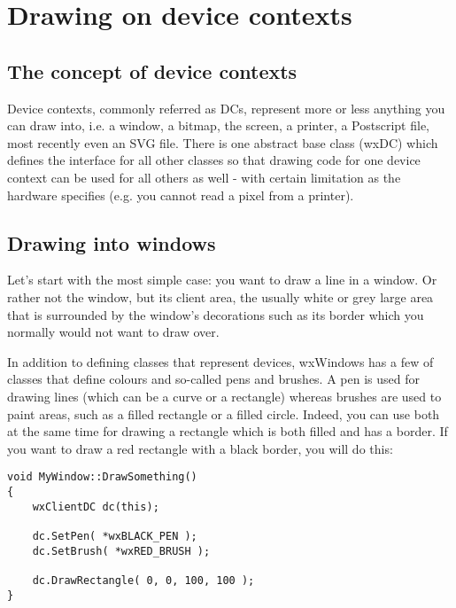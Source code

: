 \chapter{Drawing on device contexts}\label{chapdrawing}
%
%
\setfooter{\thepage}{}{}{}{}{\thepage}%

\section{The concept of device contexts}

Device contexts, commonly referred as DCs, represent more or less anything
you can draw into, i.e. a window, a bitmap, the screen, a printer, a Postscript
file, most recently even an SVG file. There is one abstract base class (wxDC)
which defines the interface for all other classes so that drawing code for
one device context can be used for all others as well - with certain limitation
as the hardware specifies (e.g. you cannot read a pixel from a printer).

\section{Drawing into windows}

Let's start with the most simple case: you want to draw a line in a window.
Or rather not the window, but its client area, the usually white or grey
large area that is surrounded by the window's decorations such as its border
which you normally would not want to draw over.

In addition to defining classes that represent devices, wxWindows has a few
of classes that define colours and so-called pens and brushes. A pen is used
for drawing lines (which can be a curve or a rectangle) whereas brushes are
used to paint areas, such as a filled rectangle or a filled circle. Indeed,
you can use both at the same time for drawing a rectangle which is both filled
and has a border. If you want to draw a red rectangle with a black border,
you will do this:

\begin{verbatim}
void MyWindow::DrawSomething()
{
    wxClientDC dc(this);
    
    dc.SetPen( *wxBLACK_PEN );
    dc.SetBrush( *wxRED_BRUSH );
    
    dc.DrawRectangle( 0, 0, 100, 100 );
}
\end{verbatim}

